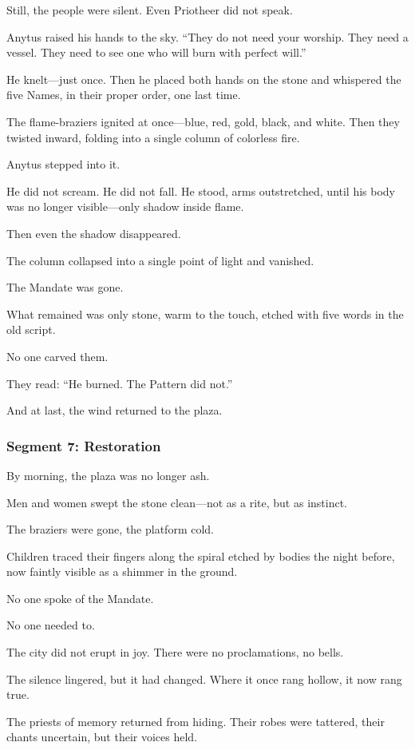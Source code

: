 \documentclass[9pt]{article}
\begin{document}
Still, the people were silent. Even Priotheer did not speak.

Anytus raised his hands to the sky. “They do not need your worship. They need a vessel. They need to see one who will burn with perfect will.”

He knelt—just once. Then he placed both hands on the stone and whispered the five Names, in their proper order, one last time.

The flame-braziers ignited at once—blue, red, gold, black, and white. Then they twisted inward, folding into a single column of colorless fire.

Anytus stepped into it.

He did not scream. He did not fall. He stood, arms outstretched, until his body was no longer visible—only shadow inside flame.

Then even the shadow disappeared.

The column collapsed into a single point of light and vanished.

The Mandate was gone.

What remained was only stone, warm to the touch, etched with five words in the old script.

No one carved them.

They read: “He burned. The Pattern did not.”

And at last, the wind returned to the plaza.

\newpage

\subsubsection*{Segment 7: Restoration}

By morning, the plaza was no longer ash.

Men and women swept the stone clean—not as a rite, but as instinct. 

The braziers were gone, the platform cold. 

Children traced their fingers along the spiral etched by bodies the night before, now faintly visible as a shimmer in the ground. 

No one spoke of the Mandate. 

No one needed to.

The city did not erupt in joy. There were no proclamations, no bells. 

The silence lingered, but it had changed. Where it once rang hollow, it now rang true.

The priests of memory returned from hiding. Their robes were tattered, their chants uncertain, but their voices held. 
\end{document}
